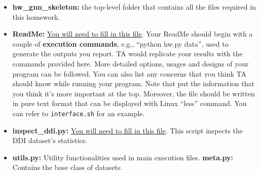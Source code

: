 %
\begin{itemize}
%
\item
    \textbf{hw\homeworknumber\_gnn\_skeleton:}
    the top-level folder that contains all the files required in this homework.
%
\item
    \textbf{ReadMe:}
    \underline{You will need to fill in this file}. Your ReadMe should begin with a couple of \textbf{execution commands},
    e.g., ``python hw\homeworknumber.py data'', used to generate the outputs
    you report.
    TA would replicate your results with the commands provided here.
    More detailed options, usages and designs of your program can be followed.
    You can also list any concerns that you think TA should know while running
    your program.
    Note that put the information that you think it's more important at the
    top.
    Moreover, the file should be written in pure text format that can be
    displayed with Linux ``less'' command.
    You can refer to \texttt{interface.sh} for an example.

%
\item
    \textbf{inspect\_ddi.py:}
    \underline{You will need to fill in this file}. This script inspects the DDI dataset's statistics.

%
\item
    \textbf{utils.py:}
    Utility functionalities used in main execution files.
    \textbf{meta.py:}
    Contains the base class of datasets.


\end{itemize}
